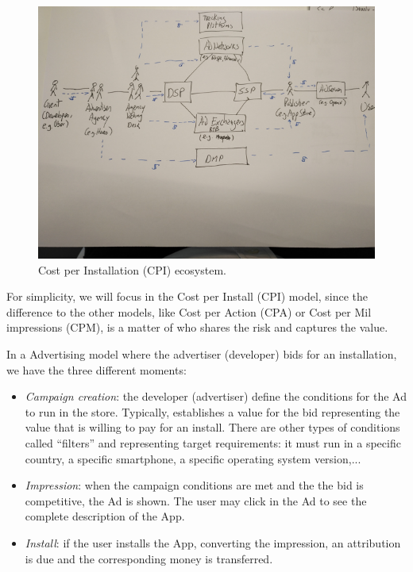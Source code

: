 \begin{figure}[!ht]
\centering
\includegraphics[width=\textwidth]{diagrams/cpi.png}
\caption{Cost per Installation (CPI) ecosystem.}
\label{fig:exist_flows}
\end{figure}

For simplicity, we will focus in the Cost per Install (CPI) model, since the difference to the other models, like Cost per Action (CPA) or Cost per Mil impressions (CPM), is a matter of who shares the risk and captures the value.

In a Advertising model where the advertiser (developer) bids for an installation, we have the three different moments:


\begin{itemize}
\item {\em Campaign creation}: the developer (advertiser) define the conditions for the Ad to run in the store. Typically, establishes a value for the bid representing the value that is willing to pay for an install. There are other types of conditions called ``filters'' and representing target requirements: it must run in a specific country, a specific smartphone, a specific operating system version,...
\item {\em Impression}: when the campaign conditions are met and the the bid is competitive, the Ad is shown. The user may click in the Ad to see the complete description of the App.
\item {\em Install}: if the user installs the App, converting the impression, an attribution is due and the corresponding money is transferred.
\end{itemize}

